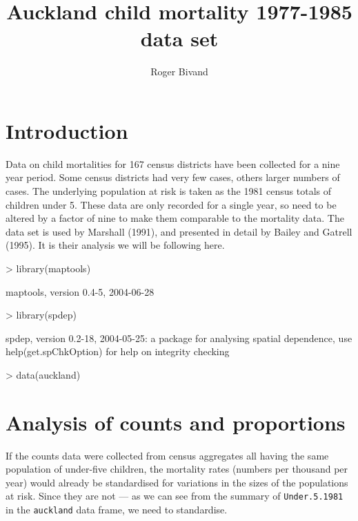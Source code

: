 \documentclass[a4paper,10pt]{article}
\title{Auckland child mortality 1977-1985 data set}
\author{Roger Bivand}
\newcommand{\code}[1]{\texttt{\small #1}}
\begin{document}
 

\maketitle 




\section{Introduction}

Data on child mortalities for 167 census districts have been collected for a nine year period. Some census districts had very few cases, others larger numbers of cases. The underlying population at risk is taken as the 1981 census totals of children under 5. These data are only recorded for a single year, so need to be altered by a factor of nine to make them comparable to the mortality data. The data set is used by Marshall (1991), and presented in detail by Bailey and Gatrell (1995). It is their analysis we will be following here.

\begin{footnotesize}
\begin{Schunk}
\begin{Sinput}
> library(maptools)
\end{Sinput}
\begin{Soutput}
maptools, version 0.4-5, 2004-06-28
\end{Soutput}
\begin{Sinput}
> library(spdep)
\end{Sinput}
\begin{Soutput}
spdep, version 0.2-18, 2004-05-25:
 a package for analysing spatial dependence,
 use help(get.spChkOption) for help on integrity checking
\end{Soutput}
\begin{Sinput}
> data(auckland)
\end{Sinput}
\end{Schunk}
\end{footnotesize}

\section{Analysis of counts and proportions}

If the counts data were collected from census aggregates all having the same population of under-five children, the mortality rates (numbers per thousand per year) would already be standardised for variations in the sizes of the populations at risk. Since they are not --- as we can see from the summary of \code{Under.5.1981} in the \code{auckland} data frame, we need to standardise.
\end{document}

